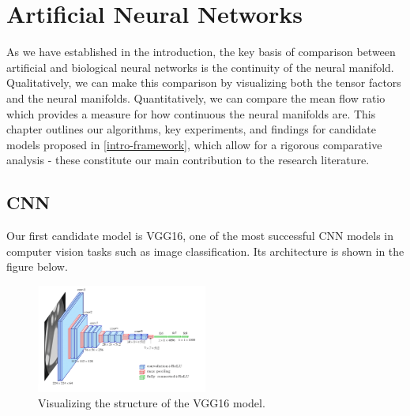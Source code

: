 \chapter{Artificial Neural Networks} 
\label{chapter-artificial} 

As we have established in the introduction, the key basis of comparison between artificial and biological neural networks is the continuity of the neural manifold. Qualitatively, we can make this comparison by visualizing both the tensor factors and the neural manifolds. Quantitatively, we can compare the mean flow ratio which provides a measure for how continuous the neural manifolds are. This chapter outlines our algorithms, key experiments, and findings for candidate models proposed in \ref{intro-framework}, which allow for a rigorous comparative analysis - these constitute our main contribution to the research literature. 

\section{CNN}
Our first candidate model is VGG16, one of the most successful CNN models in computer vision tasks such as image classification. Its architecture is shown in the figure below.
\begin{figure}[H]
    \centering
        \includegraphics[width=0.5\textwidth]{figures/artificial/vgg16.png}
        \caption{Visualizing the structure of the VGG16 model.}
\end{figure}
    
